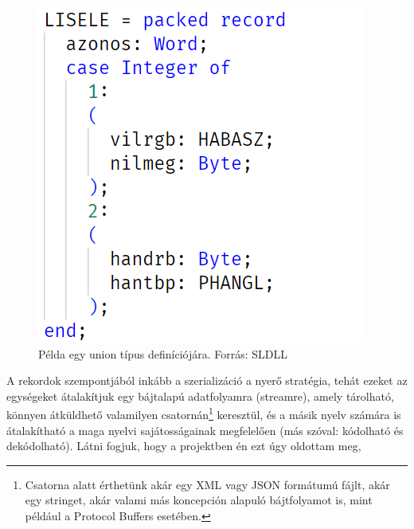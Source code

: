 \documentclass[tocnopagenum]{thesis-ekf}
\begin{document}
	\begin{figure}[h!]
		\centering
		\includegraphics[scale=0.7]{sldll_union}
		\caption{Példa egy union típus definíciójára. Forrás: SLDLL}
		\label{fig:sldll_union}
	\end{figure}
	
	A rekordok szempontjából inkább a szerializáció a nyerő stratégia, tehát ezeket az egységeket átalakítjuk egy bájtalapú adatfolyamra (streamre), amely tárolható, könnyen átküldhető valamilyen csatornán\footnote{Csatorna alatt érthetünk akár egy XML vagy JSON formátumú fájlt, akár egy stringet, akár valami más koncepción alapuló bájtfolyamot is, mint például a Protocol Buffers esetében.} keresztül, és a másik nyelv számára is átalakítható a maga nyelvi sajátosságainak megfelelően (más szóval: kódolható és dekódolható).
	Látni fogjuk, hogy a projektben én ezt úgy oldottam meg,
\end{document}
